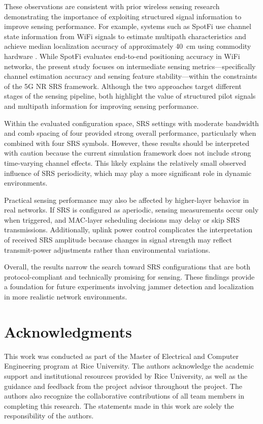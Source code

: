 \documentclass[conference]{IEEEtran}
\begin{document}
These observations are consistent with prior wireless sensing research demonstrating the importance of exploiting structured signal information to improve sensing performance. For example, systems such as SpotFi use channel state information from WiFi signals to estimate multipath characteristics and achieve median localization accuracy of approximately 40~cm using commodity hardware \cite{article}. While SpotFi evaluates end-to-end positioning accuracy in WiFi networks, the present study focuses on intermediate sensing metrics—specifically channel estimation accuracy and sensing feature stability—within the constraints of the 5G NR SRS framework. Although the two approaches target different stages of the sensing pipeline, both highlight the value of structured pilot signals and multipath information for improving sensing performance.

Within the evaluated configuration space, SRS settings with moderate bandwidth and comb spacing of four provided strong overall performance, particularly when combined with four SRS symbols. However, these results should be interpreted with caution because the current simulation framework does not include strong time-varying channel effects. This likely explains the relatively small observed influence of SRS periodicity, which may play a more significant role in dynamic environments.

Practical sensing performance may also be affected by higher-layer behavior in real networks. If SRS is configured as aperiodic, sensing measurements occur only when triggered, and MAC-layer scheduling decisions may delay or skip SRS transmissions. Additionally, uplink power control complicates the interpretation of received SRS amplitude because changes in signal strength may reflect transmit-power adjustments rather than environmental variations.

Overall, the results narrow the search toward SRS configurations that are both protocol-compliant and technically promising for sensing. These findings provide a foundation for future experiments involving jammer detection and localization in more realistic network environments.

\section*{Acknowledgments}

This work was conducted as part of the Master of Electrical and Computer Engineering program at Rice University. The authors acknowledge the academic support and institutional resources provided by Rice University, as well as the guidance and feedback from the project advisor throughout the project. The authors also recognize the collaborative contributions of all team members in completing this research. The statements made in this work are solely the responsibility of the authors.
\end{document}
